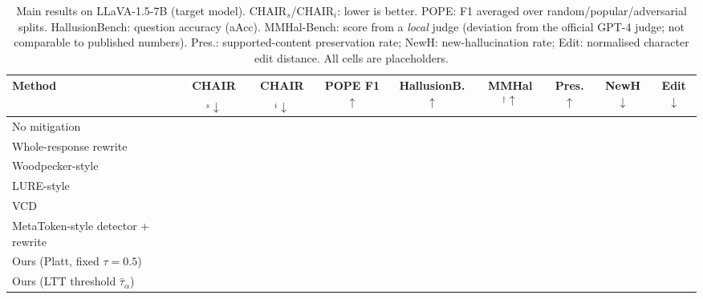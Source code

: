 \begin{table}[t]
\centering
\caption{Main results on LLaVA-1.5-7B (target model). CHAIR$_s$/CHAIR$_i$: lower is better. POPE: F1 averaged over random/popular/adversarial splits. HallusionBench: question accuracy (aAcc). MMHal-Bench: score from a \emph{local} judge (deviation from the official GPT-4 judge; not comparable to published numbers). Pres.: supported-content preservation rate; NewH: new-hallucination rate; Edit: normalised character edit distance. All cells are placeholders.}
\label{tab:main}
\small
\begin{tabular}{lcccccccc}
\toprule
Method & CHAIR$_s\downarrow$ & CHAIR$_i\downarrow$ & POPE F1$\uparrow$ & HallusionB.$\uparrow$ & MMHal$^\dagger\uparrow$ & Pres.$\uparrow$ & NewH$\downarrow$ & Edit$\downarrow$ \\
\midrule
No mitigation            & \TBD{} & \TBD{} & \TBD{} & \TBD{} & \TBD{} & \TBD{} & \TBD{} & \TBD{} \\
Whole-response rewrite   & \TBD{} & \TBD{} & \TBD{} & \TBD{} & \TBD{} & \TBD{} & \TBD{} & \TBD{} \\
Woodpecker-style~\cite{yin2024woodpecker} & \TBD{} & \TBD{} & \TBD{} & \TBD{} & \TBD{} & \TBD{} & \TBD{} & \TBD{} \\
LURE-style~\cite{zhou2024lure} & \TBD{} & \TBD{} & \TBD{} & \TBD{} & \TBD{} & \TBD{} & \TBD{} & \TBD{} \\
VCD~\cite{leng2024vcd}   & \TBD{} & \TBD{} & \TBD{} & \TBD{} & \TBD{} & \TBD{} & \TBD{} & \TBD{} \\
MetaToken-style detector + rewrite~\cite{fieback2024metatoken} & \TBD{} & \TBD{} & \TBD{} & \TBD{} & \TBD{} & \TBD{} & \TBD{} & \TBD{} \\
\midrule
Ours (Platt, fixed $\tau{=}0.5$) & \TBD{} & \TBD{} & \TBD{} & \TBD{} & \TBD{} & \TBD{} & \TBD{} & \TBD{} \\
Ours (LTT threshold $\hat\tau_\alpha$) & \TBD{} & \TBD{} & \TBD{} & \TBD{} & \TBD{} & \TBD{} & \TBD{} & \TBD{} \\
\bottomrule
\end{tabular}
\end{table}
